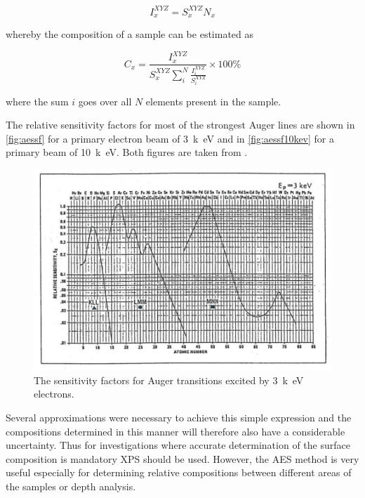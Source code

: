 \begin{equation}
I^{XYZ}_x=S_x^{XYZ}N_x
\end{equation}
          
\noindent whereby the composition of a sample can be estimated as

\begin{equation}
C_x=\frac{I^{XYZ}_x}{S_x^{XYZ}\sum_i^N\frac{I^{XYZ}_i}{S_i^{XYZ}}}\times 100\%
\end{equation}
            
\noindent where the sum $i$ goes over all $N$ elements present in the sample.

The relative sensitivity factors for most of the strongest Auger lines are shown in \autoref{fig:aessf} for a primary electron beam of \SI{3}{k\electronvolt} and in \autoref{fig:aessf10kev} for a primary beam of \SI{10}{k\electronvolt}. Both figures are taken from \cite{handbook}.

\begin{figure}[h!]
	\begin{center}
	\includegraphics[scale=4.5]{figures/06_12.png}
	\caption{The sensitivity factors for Auger transitions excited by \SI{3}{k\electronvolt} electrons.}
	\label{fig:aessf}
	\end{center}
\end{figure}

Several approximations were necessary to achieve this simple expression and the compositions determined in this manner will therefore also have a considerable uncertainty. Thus for investigations where accurate determination of the surface composition is mandatory XPS should be used. However, the AES method is very useful especially for determining relative compositions between different areas of the samples or depth analysis.

